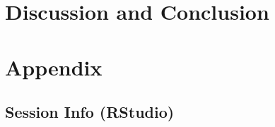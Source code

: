 \documentclass[
  12pt,
]{article}
\numberwithin{equation}{section}
\numberwithin{table}{section}
\numberwithin{figure}{section}
\begin{document}
\hypertarget{discussion-and-conclusion}{%
\section{Discussion and Conclusion}\label{discussion-and-conclusion}}

\appendix
\section*{Appendix}
\renewcommand{\thesubsection}{\Alph{subsection}}
\newcommand{\subsectionbreak}{\clearpage\phantomsection}

\normalsize

\hypertarget{session-info-rstudio}{%
\subsection{Session Info (RStudio)}\label{session-info-rstudio}}

\footnotesize
\end{document}
